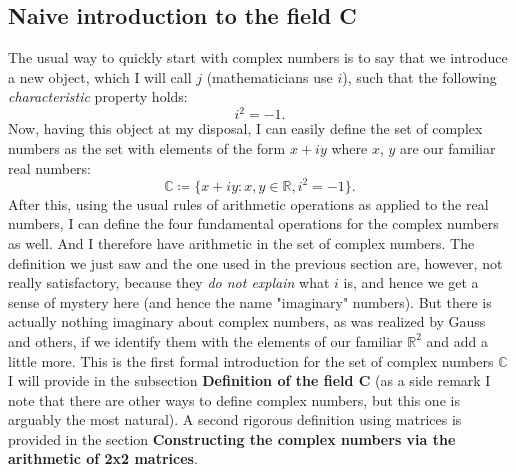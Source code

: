 \documentclass[12pt,oneside,openany]{memoir}
\numberwithin{equation}{subsection}
\begin{document}
\subsection{Naive introduction to the field C}
The usual way to quickly start with complex numbers is to say that we introduce a new object, which I will call $j$ (mathematicians use $i$), such that the following \textit{characteristic} property holds:
\[
	i^2 = -1.
\]
Now, having this object at my disposal, I can easily define the set of complex numbers as the set with elements of the form $x + iy$ where $x$, $y$ are our familiar real numbers:
\[
\mathbb{C} \coloneqq \{x + iy : x,y \in \mathbb{R}, i^2 = -1\}.
\]
After this, using the usual rules of arithmetic operations as applied to the real numbers, I can define the four fundamental operations for the complex numbers as well. And I therefore have arithmetic in the set of complex numbers.
\bigbreak\noindent
The definition we just saw and the one used in the previous section are, however, not really satisfactory, because they \textit{do not explain} what $i$ is, and hence we get a sense of mystery here (and hence the name "imaginary" numbers). But there is actually nothing imaginary about complex numbers, as was realized by Gauss and others, if we identify them with the elements of our familiar $\mathbb{R}^2$ and add a little more. This is the first formal introduction for the set of complex numbers $\mathbb{C}$ I will provide in the subsection \textbf{Definition of the field C} (as a side remark I note that there are other ways to define complex numbers, but this one is arguably the most natural). A second rigorous definition using matrices is provided in the section \textbf{Constructing the complex numbers via the arithmetic of 2x2 matrices}.
\end{document}
